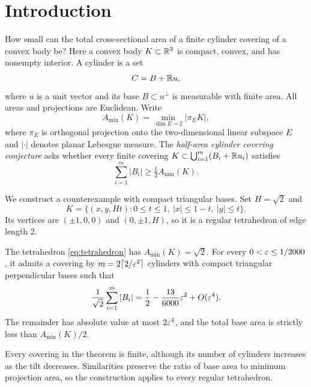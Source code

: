 \section{Introduction}

How small can the total cross-sectional area of a finite cylinder covering
of a convex body be? Here a convex body $K\subset\mathbb R^3$ is compact, convex,
and has nonempty interior. A cylinder is a set
\[
 C=B+\mathbb R u,
\]
where $u$ is a unit vector and its base $B\subset u^\perp$ is measurable
with finite area. All areas and projections are Euclidean. Write
\[
 A_{\min}(K)=\min_{\dim E=2}|\pi_EK|,
\]
where $\pi_E$ is orthogonal projection onto the two-dimensional linear
subspace $E$ and $|\cdot|$ denotes planar Lebesgue measure.
The \emph{half-area cylinder covering conjecture} asks whether every
finite covering $K\subset\bigcup_{i=1}^m(B_i+\mathbb R u_i)$ satisfies
\begin{equation}\label{eq:conjectured-bound}
 \sum_{i=1}^m|B_i|\ge\tfrac12 A_{\min}(K).
\end{equation}



We construct a counterexample with compact triangular bases. Set
$H=\sqrt2$ and
\begin{equation}\label{eq:tetrahedron}
 K=\{(x,y,Ht):0\le t\le1,\ |x|\le1-t,\ |y|\le t\}.
\end{equation}
Its vertices are $(\pm1,0,0)$ and $(0,\pm1,H)$, so it is a regular
tetrahedron of edge length $2$.

\begin{theorem}\label{thm:counterexample}
The tetrahedron \eqref{eq:tetrahedron} has $A_{\min}(K)=\sqrt2$.
For every $0<\varepsilon\le1/2000$, it admits a covering by
$m=2\lceil2/\varepsilon^2\rceil$ cylinders with compact triangular perpendicular
bases such that
\begin{equation}\label{eq:main-asymptotic}
 \frac1{\sqrt2}\sum_{i=1}^m|B_i|
 =\frac12-\frac{13}{6000}\varepsilon^2+O(\varepsilon^4).
\end{equation}
The remainder has absolute value at most $2\varepsilon^4$, and the total base
area is strictly less than $A_{\min}(K)/2$.
\end{theorem}

Every covering in the theorem is finite, although its number of cylinders
increases as the tilt decreases. Similarities preserve the ratio of base
area to minimum projection area, so the construction applies to every
regular tetrahedron.

